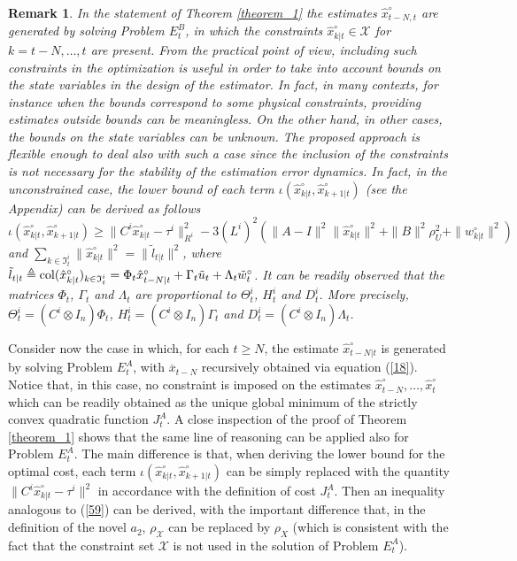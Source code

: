 \documentclass[11pt,journal,onecolumn]{IEEEtran}
\newtheorem{remark}{Remark}
\begin{document}
\begin{remark}
In the statement of Theorem \ref{theorem_1} the estimates $\hat{x}_{t-N,t}^{\circ}$ are generated by solving Problem $E^{B}_t$, in which the constraints $\hat{x}^{\circ}_{k|t} \in \mathcal X$ for $k= t-N , \ldots,t$ are present. From the practical point of view, including such constraints in the optimization is useful in order to take into account bounds on the state variables in the design of the estimator. In fact,
in many contexts, for instance when the bounds correspond to some physical constraints, providing estimates outside bounds can be meaningless.
On the other hand, in other cases, the bounds on the state variables can be unknown. The proposed approach is flexible enough to deal also with such a case since the inclusion of the constraints is not necessary for the stability of the estimation error dynamics. In fact, in the unconstrained case,
the lower bound of each term $\iota(\hat{x}_{k|t}^{\circ},\hat{x}_{k+1|t}^{\circ})$ (see the Appendix) can be derived as follows
\begin{equation*}
\iota(\hat{x}_{k|t}^{\circ},\hat{x}_{k+1|t}^{\circ}) \geq \|C^{i}\hat{x}_{k|t}^{\circ}-\tau^{i}\|^{2}_{R^{i}}-3(L^{i})^{2}\left(\|A-I\|^{2}\|\hat{x}_{k|t}^{\circ}\|^{2}
+\|B\|^{2}\rho_{U}^{2}+\|w^{\circ}_{k|t}\|^{2}\right)
\end{equation*}
and $\sum_{k\in\mathfrak{I}_{t}^{i}}\|\hat{x}_{k|t}^{\circ}\|^{2}=\|\tilde{l}_{t|t}\|^{2}$, where
$\tilde{l}_{t|t}\triangleq{\rm col}(\hat{x}_{k|t}^{\circ})_{k\in\mathfrak{I}_{t}^{i}}=\Phi_{t}\hat{x}_{t-N|t}^{\circ}+\Gamma_{t}\tilde{u}_{t}+\Lambda_{t}\tilde{w}_{t}^{\circ}$.
It can be readily observed that the matrices $\Phi_{t}$, $\Gamma_{t}$ and $\Lambda_{t}$ are proportional to $\Theta^{i}_{t}$, $H^{i}_{t}$ and $D^{i}_{t}$.
More precisely, $\Theta_{t}^{i}=(C^{i}\otimes I_{n})\Phi_{t}$, $H_{t}^{i}=(C^{i}\otimes I_{n})\Gamma_{t}$ and $D_{t}^{i}=(C^{i}\otimes I_{n})\Lambda_{t}$.
\end{remark}

Consider now the case in which, for each $t \ge N$, the estimate $\hat x_{t-N|t}^\circ$ is generated by solving Problem $E^A_t$, with $\overline x_{t-N}$ recursively obtained via equation (\ref{18}). Notice that, in this case, no constraint is imposed on the estimates $\hat x^\circ_{t-N} , \ldots, \hat x^\circ_{t} $ which can be readily obtained as the unique global minimum of the strictly convex quadratic function $J_t^A$. A close inspection of the proof of Theorem \ref{theorem_1} shows that the same line of reasoning can be applied also for Problem $E^A_t$. The main difference is that, when deriving the lower bound for the optimal cost, each term $\iota(\hat{x}_{k|t}^{\circ},\hat{x}_{k+1|t}^{\circ})$ can be simply replaced with the quantity $\|C^{i}\hat{x}^{\circ}_{k|t}-\tau^{i}\|^{2}$ in accordance with the definition of cost $J^{A}_{t}$. Then an inequality analogous to (\ref{59}) can be derived, with the important difference that, in the definition of the novel $a_2$, $\rho_{\mathcal X}$ can be replaced by $\rho_X$  (which is consistent with the fact that the constraint set $\mathcal X$ is not used in the solution of Problem $E^A_t$).
\end{document}
